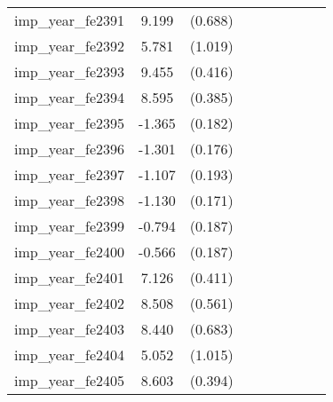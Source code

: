 {\begin{tabular}{l*{4}{cc}}
imp\_year\_fe2391&    9.199\sym{***}&  (0.688)&                  &         &                  &         &                  &         \\
imp\_year\_fe2392&    5.781\sym{***}&  (1.019)&                  &         &                  &         &                  &         \\
imp\_year\_fe2393&    9.455\sym{***}&  (0.416)&                  &         &                  &         &                  &         \\
imp\_year\_fe2394&    8.595\sym{***}&  (0.385)&                  &         &                  &         &                  &         \\
imp\_year\_fe2395&   -1.365\sym{***}&  (0.182)&                  &         &                  &         &                  &         \\
imp\_year\_fe2396&   -1.301\sym{***}&  (0.176)&                  &         &                  &         &                  &         \\
imp\_year\_fe2397&   -1.107\sym{***}&  (0.193)&                  &         &                  &         &                  &         \\
imp\_year\_fe2398&   -1.130\sym{***}&  (0.171)&                  &         &                  &         &                  &         \\
imp\_year\_fe2399&   -0.794\sym{***}&  (0.187)&                  &         &                  &         &                  &         \\
imp\_year\_fe2400&   -0.566\sym{**} &  (0.187)&                  &         &                  &         &                  &         \\
imp\_year\_fe2401&    7.126\sym{***}&  (0.411)&                  &         &                  &         &                  &         \\
imp\_year\_fe2402&    8.508\sym{***}&  (0.561)&                  &         &                  &         &                  &         \\
imp\_year\_fe2403&    8.440\sym{***}&  (0.683)&                  &         &                  &         &                  &         \\
imp\_year\_fe2404&    5.052\sym{***}&  (1.015)&                  &         &                  &         &                  &         \\
imp\_year\_fe2405&    8.603\sym{***}&  (0.394)&                  &         &                  &         &                  &         \\

\end{tabular}}
